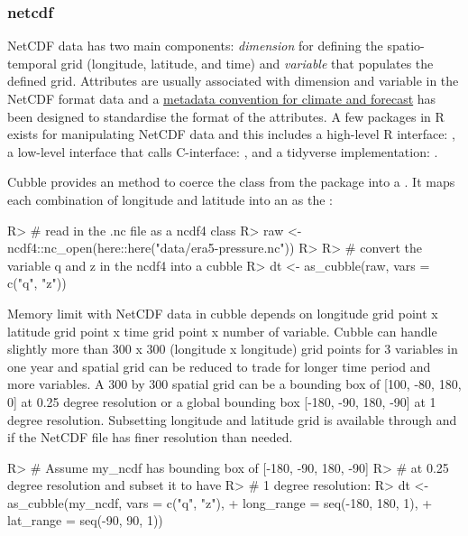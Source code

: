 \documentclass[
]{jss}
\begin{document}
\hypertarget{netcdf}{%
\subsubsection{netcdf}\label{netcdf}}

NetCDF data has two main components: \emph{dimension} for defining the
spatio-temporal grid (longitude, latitude, and time) and \emph{variable}
that populates the defined grid. Attributes are usually associated with
dimension and variable in the NetCDF format data and a
\href{http://cfconventions.org/}{metadata convention for climate and
forecast} has been designed to standardise the format of the attributes.
A few packages in R exists for manipulating NetCDF data and this
includes a high-level R interface:  \citep{ncdf4}, a
low-level interface that calls C-interface: 
\citep{rnetcdf, michna2013rnetcdf}, and a tidyverse implementation:
 \citep{tidync}.

Cubble provides an  method to coerce the 
class from the  package into a . It maps each
combination of longitude and latitude into an  as the
:

\begin{CodeChunk}
\begin{CodeInput}
R> # read in the .nc file as a ncdf4 class
R> raw <- ncdf4::nc_open(here::here("data/era5-pressure.nc"))
R> 
R> # convert the variable q and z in the ncdf4 into a cubble
R> dt <- as_cubble(raw, vars = c("q", "z"))
\end{CodeInput}
\end{CodeChunk}

Memory limit with NetCDF data in cubble depends on longitude grid point
x latitude grid point x time grid point x number of variable. Cubble can
handle slightly more than 300 x 300 (longitude x longitude) grid points
for 3 variables in one year and spatial grid can be reduced to trade for
longer time period and more variables. A 300 by 300 spatial grid can be
a bounding box of {[}100, -80, 180, 0{]} at 0.25 degree resolution or a
global bounding box {[}-180, -90, 180, -90{]} at 1 degree resolution.
Subsetting longitude and latitude grid is available through
 and  if the NetCDF file has finer
resolution than needed.

\begin{CodeChunk}
\begin{CodeInput}
R> # Assume my_ncdf has bounding box of [-180, -90, 180, -90] 
R> # at 0.25 degree resolution and subset it to have 
R> # 1 degree resolution:
R> dt <- as_cubble(my_ncdf, vars = c("q", "z"), 
+                 long_range = seq(-180, 180, 1), 
+                 lat_range = seq(-90, 90, 1))
\end{CodeInput}
\end{CodeChunk}
\end{document}
